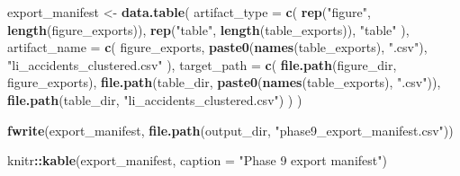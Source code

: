 \documentclass[
]{article}
\newenvironment{Shaded}{\begin{snugshade}}{\end{snugshade}}
\newcommand{\AttributeTok}[1]{\textcolor[rgb]{0.13,0.29,0.53}{#1}}
\newcommand{\FunctionTok}[1]{\textcolor[rgb]{0.13,0.29,0.53}{\textbf{#1}}}
\newcommand{\NormalTok}[1]{#1}
\newcommand{\OtherTok}[1]{\textcolor[rgb]{0.56,0.35,0.01}{#1}}
\newcommand{\SpecialCharTok}[1]{\textcolor[rgb]{0.81,0.36,0.00}{\textbf{#1}}}
\newcommand{\StringTok}[1]{\textcolor[rgb]{0.31,0.60,0.02}{#1}}
\begin{document}
\begin{Shaded}
\begin{Highlighting}[]
\NormalTok{export\_manifest }\OtherTok{\textless{}{-}} \FunctionTok{data.table}\NormalTok{(}
  \AttributeTok{artifact\_type =} \FunctionTok{c}\NormalTok{(}
    \FunctionTok{rep}\NormalTok{(}\StringTok{"figure"}\NormalTok{, }\FunctionTok{length}\NormalTok{(figure\_exports)),}
    \FunctionTok{rep}\NormalTok{(}\StringTok{"table"}\NormalTok{, }\FunctionTok{length}\NormalTok{(table\_exports)),}
    \StringTok{"table"}
\NormalTok{  ),}
  \AttributeTok{artifact\_name =} \FunctionTok{c}\NormalTok{(}
\NormalTok{    figure\_exports,}
    \FunctionTok{paste0}\NormalTok{(}\FunctionTok{names}\NormalTok{(table\_exports), }\StringTok{".csv"}\NormalTok{),}
    \StringTok{"li\_accidents\_clustered.csv"}
\NormalTok{  ),}
  \AttributeTok{target\_path =} \FunctionTok{c}\NormalTok{(}
    \FunctionTok{file.path}\NormalTok{(figure\_dir, figure\_exports),}
    \FunctionTok{file.path}\NormalTok{(table\_dir, }\FunctionTok{paste0}\NormalTok{(}\FunctionTok{names}\NormalTok{(table\_exports), }\StringTok{".csv"}\NormalTok{)),}
    \FunctionTok{file.path}\NormalTok{(table\_dir, }\StringTok{"li\_accidents\_clustered.csv"}\NormalTok{)}
\NormalTok{  )}
\NormalTok{)}

\FunctionTok{fwrite}\NormalTok{(export\_manifest, }\FunctionTok{file.path}\NormalTok{(output\_dir, }\StringTok{"phase9\_export\_manifest.csv"}\NormalTok{))}

\NormalTok{knitr}\SpecialCharTok{::}\FunctionTok{kable}\NormalTok{(export\_manifest, }\AttributeTok{caption =} \StringTok{"Phase 9 export manifest"}\NormalTok{)}
\end{Highlighting}
\end{Shaded}
\end{document}
